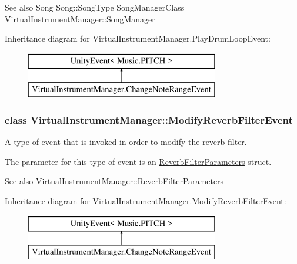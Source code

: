 \begin{DoxySeeAlso}{See also}
Song Song\+::\+Song\+Type Song\+Manager\+Class \hyperlink{group___virtual_instrument_manager_a33dae94932c10c66db76a0eebec76b01}{Virtual\+Instrument\+Manager\+::\+Song\+Manager} 
\end{DoxySeeAlso}
Inheritance diagram for Virtual\+Instrument\+Manager.\+Play\+Drum\+Loop\+Event\+:\begin{figure}[H]
\begin{center}
\leavevmode
\includegraphics[height=2.000000cm]{group___virtual_instrument_manager}
\end{center}
\end{figure}
\label{class_virtual_instrument_manager_1_1_modify_reverb_filter_event}
\subsubsection{class Virtual\+Instrument\+Manager\+:\+:Modify\+Reverb\+Filter\+Event}
A type of event that is invoked in order to modify the reverb filter. 

The parameter for this type of event is an \hyperlink{group___virtual_instrument_manager_struct_virtual_instrument_manager_1_1_reverb_filter_parameters}{Reverb\+Filter\+Parameters} struct.

\begin{DoxySeeAlso}{See also}
\hyperlink{group___virtual_instrument_manager_struct_virtual_instrument_manager_1_1_reverb_filter_parameters}{Virtual\+Instrument\+Manager\+::\+Reverb\+Filter\+Parameters} 
\end{DoxySeeAlso}
Inheritance diagram for Virtual\+Instrument\+Manager.\+Modify\+Reverb\+Filter\+Event\+:\begin{figure}[H]
\begin{center}
\leavevmode
\includegraphics[height=2.000000cm]{group___virtual_instrument_manager}
\end{center}
\end{figure}
\label{class_virtual_instrument_manager_1_1_modify_echo_filter_event}
